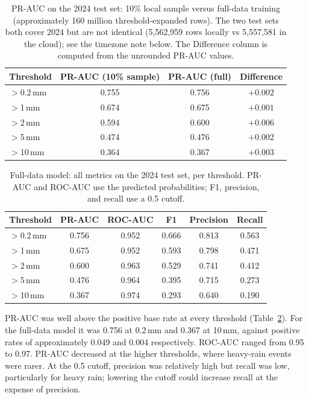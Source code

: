 \documentclass[11pt]{article}
\begin{document}
\begin{table}[H]
  \centering
  \caption{PR-AUC on the 2024 test set: 10\% local sample versus full-data training (approximately 160 million threshold-expanded rows). The two test sets both cover 2024 but are not identical (5{,}562{,}959 rows locally vs 5{,}557{,}581 in the cloud); see the timezone note below. The Difference column is computed from the unrounded PR-AUC values.}
  \label{tab:prauc}
  \begin{tabular}{lccc}
    \toprule
    Threshold & PR-AUC (10\% sample) & PR-AUC (full) & Difference \\
    \midrule
    $>$0.2\,mm & 0.755 & 0.756 & $+0.002$ \\
    $>$1\,mm   & 0.674 & 0.675 & $+0.001$ \\
    $>$2\,mm   & 0.594 & 0.600 & $+0.006$ \\
    $>$5\,mm   & 0.474 & 0.476 & $+0.002$ \\
    $>$10\,mm  & 0.364 & 0.367 & $+0.003$ \\
    \bottomrule
  \end{tabular}
\end{table}

\begin{table}[H]
  \centering
  \caption{Full-data model: all metrics on the 2024 test set, per threshold. PR-AUC and ROC-AUC use the predicted probabilities; F1, precision, and recall use a 0.5 cutoff.}
  \label{tab:fullmetrics}
  \begin{tabular}{lccccc}
    \toprule
    Threshold & PR-AUC & ROC-AUC & F1 & Precision & Recall \\
    \midrule
    $>$0.2\,mm & 0.756 & 0.952 & 0.666 & 0.813 & 0.563 \\
    $>$1\,mm   & 0.675 & 0.952 & 0.593 & 0.798 & 0.471 \\
    $>$2\,mm   & 0.600 & 0.963 & 0.529 & 0.741 & 0.412 \\
    $>$5\,mm   & 0.476 & 0.964 & 0.395 & 0.715 & 0.273 \\
    $>$10\,mm  & 0.367 & 0.974 & 0.293 & 0.640 & 0.190 \\
    \bottomrule
  \end{tabular}
\end{table}

PR-AUC was well above the positive base rate at every threshold (Table~\ref{tab:fullmetrics}). For the full-data model it was 0.756 at 0.2\,mm and 0.367 at 10\,mm, against positive rates of approximately 0.049 and 0.004 respectively. ROC-AUC ranged from 0.95 to 0.97. PR-AUC decreased at the higher thresholds, where heavy-rain events were rarer. At the 0.5 cutoff, precision was relatively high but recall was low, particularly for heavy rain; lowering the cutoff could increase recall at the expense of precision.
\end{document}
